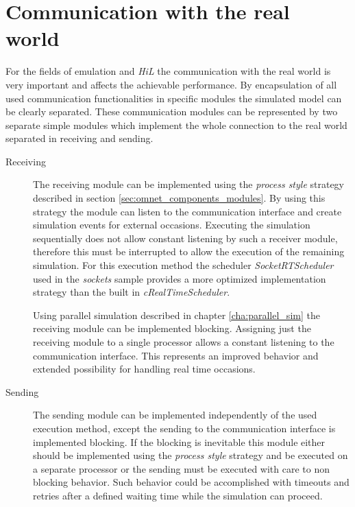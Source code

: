 \section{Communication with the real world}
For the fields of emulation and \emph{HiL} the communication with the real world is very important and affects the achievable performance.
By encapsulation of all used communication functionalities in specific modules the simulated model can be clearly separated.
These communication modules can be represented by two separate simple modules which implement the whole connection to the real world separated in receiving and sending.

\begin{description}
    \item[Receiving] The receiving module can be implemented using the \emph{process style} strategy described in section \ref{sec:omnet_components_modules}.
    By using this strategy the module can listen to the communication interface and create simulation events for external occasions.
    Executing the simulation sequentially does not allow constant listening by such a receiver module, therefore this must be interrupted to allow the execution of the remaining simulation.
    For this execution method the scheduler \emph{SocketRTScheduler} used in the \emph{sockets} sample provides a more optimized implementation strategy than the built in \emph{cRealTimeScheduler}.
    
    Using parallel simulation described in chapter \ref{cha:parallel_sim} the receiving module can be implemented blocking.
    Assigning just the receiving module to a single processor allows a constant listening to the communication interface.
    This represents an improved behavior and extended possibility for handling real time occasions.
    
    \item[Sending] The sending module can be implemented independently of the used execution method, except the sending to the communication interface is implemented blocking.
    If the blocking is inevitable this module either should be implemented using the \emph{process style} strategy and be executed on a separate processor or the sending must be executed with care to non blocking behavior.
    Such behavior could be accomplished with timeouts and retries after a defined waiting time while the simulation can proceed.
\end{description}